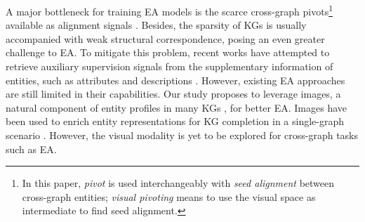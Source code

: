 \documentclass[letterpaper]{article} \usepackage{aaai21}  \usepackage{times}  \usepackage{helvet} \usepackage{courier}  \usepackage[hyphens]{url}  \usepackage{graphicx} \urlstyle{rm} \def\UrlFont{\rm}  \usepackage{natbib}  \usepackage{caption} \frenchspacing  \setlength{\pdfpagewidth}{8.5in}  \setlength{\pdfpageheight}{11in}
\begin{document}
\iffalse
\begin{figure}
    \centering
    \texttt{[image: images/big\_rock.pdf]}
    \vspace{-1em}
    \caption{A challenging example from DBP15k (EN-ZH). The entity \emph{Dwayne\_Johnson} has detailed relations in EN DBpedia while in ZH, it is only connected to \emph{English} and \emph{Fast\_and\_Furious}. Without visual information, based on the only two existing relations, it is hard to match correctly. }\label{fig:intro}
    \vspace{-1em}
\end{figure}
\fi






A major bottleneck
for training EA models is the scarce
cross-graph pivots\footnote{In this paper, \emph{pivot} is used interchangeably with \emph{seed alignment} between cross-graph entities; \emph{visual pivoting} means to use the visual space as intermediate to find seed alignment.} 
available as alignment signals
\cite{chen2017multigraph,sun2018bootstrapping}. Besides, the sparsity of KGs is usually accompanied with weak structural correspondence,
posing an even greater challenge to EA. 
To mitigate this problem,
recent works have attempted to retrieve auxiliary supervision signals from the supplementary 
information of entities, such as attributes \citep{sun2017cross,trsedya2019attr,yang2020cotsae,liu2020exploring} and descriptions \citep{chen2018co}. 
However, existing EA approaches are still limited in their capabilities. Our study proposes to leverage images, a natural component of entity profiles in many KGs \cite{lehmann2015dbpedia,vrandevcic2014wikidata,liu2019mmkg}, for better EA. Images have been used to enrich entity representations for KG completion in a single-graph scenario \citep{xie2017image,moussellySergieh2018multimodal,pezeshkpour2018embedding}. However, the visual modality is yet to be explored for cross-graph tasks such as EA.
\end{document}
